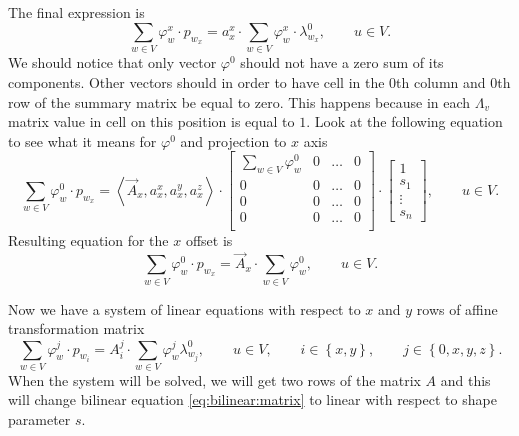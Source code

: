 The final expression is
\begin{equation*}
  \sum\limits_{w \in V} \varphi_w^x \cdot p_{w_x}
  = a_x^x \cdot \sum\limits_{w \in V} \varphi_w^x \cdot \lambda^0_{w_x},
  \qquad u \in V.
\end{equation*}
We should notice that only vector $\varphi^0$
should not have a zero sum of its components.
Other vectors should in order to have cell in the $0$th column and $0$th row
of the summary matrix be equal to zero.
This happens because in each $\Lambda_v$ matrix value in cell on this position
is equal to $1$.
Look at the following equation to see what it means for $\varphi^0$
and projection to $x$ axis
\begin{equation*}
  \sum\limits_{w \in V} \varphi_w^0 \cdot p_{w_x}
  = \left\langle \vec{A}_x, a_x^x, a_x^y, a_x^z \right\rangle
    \cdot \begin{bmatrix}
      \sum\limits_{w \in V} \varphi_w^0 & 0 & \dots & 0 \\
      0                                 & 0 & \dots   & 0 \\
      0                                 & 0 & \dots & 0 \\
      0                                 & 0 & \dots & 0 \\
    \end{bmatrix}
    \cdot \begin{bmatrix}
      1 \\
      s_1 \\
      \vdots \\
      s_n
    \end{bmatrix},
  \qquad u \in V.
\end{equation*}
Resulting equation for the $x$ offset is
\begin{equation*}
  \sum\limits_{w \in V} \varphi_w^0 \cdot p_{w_x}
  = \vec{A}_x \cdot \sum\limits_{w \in V} \varphi_w^0,
  \qquad u \in V.
\end{equation*}

Now we have a system of linear equations
with respect to $x$ and $y$ rows of affine transformation matrix
\begin{equation*}
  \sum\limits_{w \in V} \varphi_w^j \cdot p_{w_i}
  = A_i^j \cdot \sum\limits_{w \in V} \varphi_w^j \lambda^0_{w_j},
  \qquad u \in V,
  \qquad i \in \left\{ x, y \right\},
  \qquad j \in \left\{ 0, x, y, z \right\}.
\end{equation*}
When the system will be solved,
we will get two rows of the matrix $A$
and this will change bilinear equation \eqref{eq:bilinear:matrix}
to linear with respect to shape parameter $s$.
